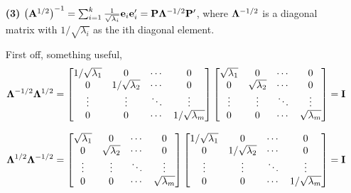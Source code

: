 \begin{enumerate}[font=\bfseries]
\begin{enumerate}
            \item[\textbf{(3)}]{${\left(\bold{A}^{1/2}\right)}^{-1} = \sum_{i=1}^k{\frac{1}{\sqrt{\lambda_i}}\bold{e}_i\bold{e}_i^\prime} = \bold{P}\bold{\Lambda}^{-1/2}\bold{P}^\prime$, where $\bold{\Lambda}^{-1/2}$ is a diagonal matrix with $1/\sqrt{\lambda_i}$ as the ith diagonal element.}
            \newline
            \par
            First off, something useful,            
            \[
                \bold{\Lambda}^{-1/2}\bold{\Lambda}^{1/2}
                =
                \begin{bmatrix}
                    1/\sqrt{\lambda_1} & 0 & \cdots & 0 \\
                    0 & 1/\sqrt{\lambda_2} & \cdots & 0 \\
                    \vdots & \vdots & \ddots & \vdots \\
                    0 & 0 & \cdots & 1/\sqrt{\lambda_m}
                \end{bmatrix}
                \begin{bmatrix}
                    \sqrt{\lambda_1} & 0 & \cdots & 0 \\
                    0 & \sqrt{\lambda_2} & \cdots & 0 \\
                    \vdots & \vdots & \ddots & \vdots \\
                    0 & 0 & \cdots & \sqrt{\lambda_m}
                \end{bmatrix}
                =
                \bold{I}
            \]

            \[
                \bold{\Lambda}^{1/2}\bold{\Lambda}^{-1/2}
                =
                \begin{bmatrix}
                    \sqrt{\lambda_1} & 0 & \cdots & 0 \\
                    0 & \sqrt{\lambda_2} & \cdots & 0 \\
                    \vdots & \vdots & \ddots & \vdots \\
                    0 & 0 & \cdots & \sqrt{\lambda_m}
                \end{bmatrix}
                \begin{bmatrix}
                    1/\sqrt{\lambda_1} & 0 & \cdots & 0 \\
                    0 & 1/\sqrt{\lambda_2} & \cdots & 0 \\
                    \vdots & \vdots & \ddots & \vdots \\
                    0 & 0 & \cdots & 1/\sqrt{\lambda_m}
                \end{bmatrix}
                =
                \bold{I}
            \]


\end{enumerate}
\end{enumerate}
